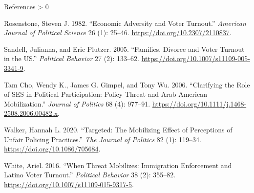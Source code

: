 \documentclass[
  ignorenonframetext,
  aspectratio=169]{beamer}
\newlength{\cslhangindent}
\newenvironment{CSLReferences}[2] %
 {%
  \setlength{\parindent}{0pt}
  \ifodd #1 \everypar{\setlength{\hangindent}{\cslhangindent}}\ignorespaces\fi
  \ifnum #2 > 0
  \setlength{\parskip}{#2\baselineskip}
  \fi
 }%
 {}
\begin{document}
\begin{frame}[allowframebreaks]{References}
\begin{CSLReferences}{1}{0}
\leavevmode\hypertarget{ref-Rosenstone1982}{}%
Rosenstone, Steven J. 1982. {``Economic {Adversity} and {Voter
Turnout}.''} \emph{American Journal of Political Science} 26 (1):
25--46. \url{https://doi.org/10.2307/2110837}.

\leavevmode\hypertarget{ref-Sandell2005}{}%
Sandell, Julianna, and Eric Plutzer. 2005. {``Families, Divorce and
Voter Turnout in the {US}.''} \emph{Political Behavior} 27 (2): 133--62.
\url{https://doi.org/10.1007/s11109-005-3341-9}.

\leavevmode\hypertarget{ref-TamCho2006a}{}%
Tam Cho, Wendy K., James G. Gimpel, and Tony Wu. 2006. {``Clarifying the
{Role} of {SES} in {Political Participation}: Policy {Threat} and {Arab
American Mobilization}.''} \emph{Journal of Politics} 68 (4): 977--91.
\url{https://doi.org/10.1111/j.1468-2508.2006.00482.x}.

\leavevmode\hypertarget{ref-Walker2020}{}%
Walker, Hannah L. 2020. {``Targeted: The {Mobilizing Effect} of
{Perceptions} of {Unfair Policing Practices}.''} \emph{The Journal of
Politics} 82 (1): 119--34. \url{https://doi.org/10.1086/705684}.

\leavevmode\hypertarget{ref-White2016}{}%
White, Ariel. 2016. {``When {Threat Mobilizes}: Immigration
{Enforcement} and {Latino Voter Turnout}.''} \emph{Political Behavior}
38 (2): 355--82. \url{https://doi.org/10.1007/s11109-015-9317-5}.

\end{CSLReferences}
\end{frame}
\end{document}
